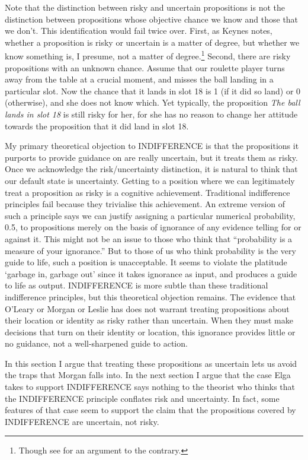 \noindent Note that the distinction between risky and uncertain propositions is not the distinction between propositions whose objective chance we know and those that we don't. This identification would fail twice over. First, as Keynes notes, whether a proposition is risky or uncertain is a matter of degree, but whether we know something is, I presume, not a matter of degree.\footnote{Though see \citet{Hetherington2001} for an argument to the contrary.} Second, there are risky propositions with an unknown chance. Assume that our roulette player turns away from the table at a crucial moment, and misses the ball landing in a particular slot. Now the chance that it lands in slot 18 is 1 (if it did so land) or 0 (otherwise), and she does not know which. Yet typically, the proposition \textit{The ball lands in slot 18} is still risky for her, for she has no reason to change her attitude towards the proposition that it did land in slot 18.

My primary theoretical objection to INDIFFERENCE is that the propositions it purports to provide guidance on are really uncertain, but it treats them as risky. Once we acknowledge the risk/uncertainty distinction, it is natural to think that our default state is uncertainty. Getting to a position where we can legitimately treat a proposition as risky is a cognitive achievement. Traditional indifference principles fail because they trivialise this achievement. An extreme version of such a principle says we can justify assigning a particular numerical probability, 0.5, to propositions merely on the basis of ignorance of any evidence telling for or against it. This might not be an issue to those who think that ``probability is a measure of your ignorance.'' \citep[348]{Poole1998} But to those of us who think probability is the very guide to life, such a position is unacceptable. It seems to violate the platitude `garbage in, garbage out' since it takes ignorance as input, and produces a guide to life as output. INDIFFERENCE is more subtle than these traditional indifference principles, but this theoretical objection remains. The evidence that O'Leary or Morgan or Leslie has does not warrant treating propositions about their location or identity as risky rather than uncertain. When they must make decisions that turn on their identity or location, this ignorance provides little or no guidance, not a well-sharpened guide to action.

In this section I argue that treating these propositions as uncertain lets us avoid the traps that Morgan falls into. In the next section I argue that the case Elga takes to support INDIFFERENCE says nothing to the theorist who thinks that the INDIFFERENCE principle conflates risk and uncertainty. In fact, some features of that case seem to support the claim that the propositions covered by INDIFFERENCE are uncertain, not risky.

